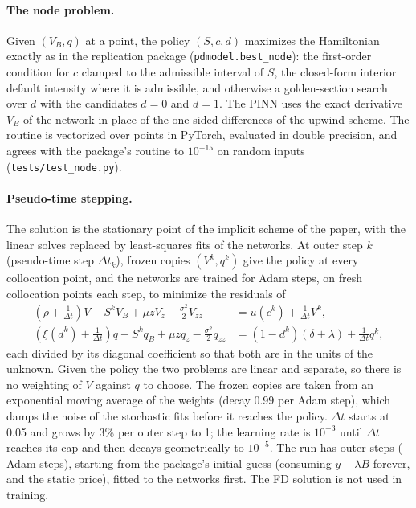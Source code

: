 \documentclass[11pt]{article}
\begin{document}
\paragraph{The node problem.} Given $(V_B,q)$ at a point, the policy $(S,c,d)$ maximizes the Hamiltonian exactly as in
the replication package (\texttt{pdmodel.best\_node}): the first-order condition for $c$ clamped to the admissible
interval of $S$, the closed-form interior default intensity where it is admissible, and otherwise a golden-section
search over $d$ with the candidates $d=0$ and $d=1$. The PINN uses the exact derivative $V_B$ of the network in place of
the one-sided differences of the upwind scheme. The routine is vectorized over points in PyTorch, evaluated in double
precision, and agrees with the package's routine to $10^{-15}$ on random inputs (\texttt{tests/test\_node.py}).

\paragraph{Pseudo-time stepping.} The solution is the stationary point of the implicit scheme of the paper, with the
linear solves replaced by least-squares fits of the networks. At outer step $k$ (pseudo-time step $\Delta t_k$), frozen
copies $(V^k,q^k)$ give the policy at every collocation point, and the networks are trained for \ninner{} Adam steps,
on fresh collocation points each step, to minimize the residuals of
\begin{align*}
(\rho+\tfrac1{\Delta t})V - S^kV_B + \mu zV_z - \tfrac{\sigma^2}{2}V_{zz} &= u(c^k) + \tfrac1{\Delta t}V^k,\\
(\xi(d^k)+\tfrac1{\Delta t})q - S^kq_B + \mu z q_z - \tfrac{\sigma^2}{2}q_{zz} &= (1-d^k)(\delta+\lambda) + \tfrac1{\Delta t}q^k,
\end{align*}
each divided by its diagonal coefficient so that both are in the units of the unknown. Given the policy the two
problems are linear and separate, so there is no weighting of $V$ against $q$ to choose. The frozen copies are taken
from an exponential moving average of the weights (decay 0.99 per Adam step), which damps the noise of the stochastic
fits before it reaches the policy. $\Delta t$ starts at 0.05 and grows by 3\% per outer step to 1; the learning rate is
$10^{-3}$ until $\Delta t$ reaches its cap and then decays geometrically to $10^{-5}$. The run has \nouter{} outer
steps (\nsteps{} Adam steps), starting from the package's initial guess (consuming $y-\lambda B$ forever, and the
static price), fitted to the networks first. The FD solution is not used in training.
\end{document}
